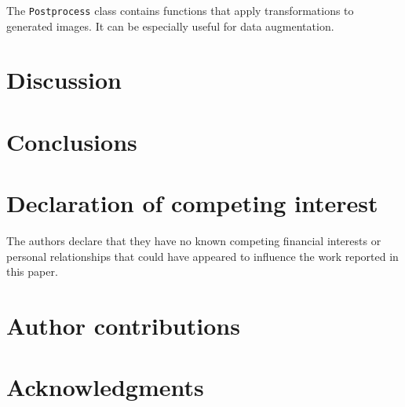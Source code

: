 \documentclass[a4paper,fleqn]{cas-dc}
\begin{document}
The \texttt{Postprocess} class contains functions that apply transformations to generated images. It can be especially useful for data augmentation.

\newpage

\section{Discussion} \label{sec:results}

%

\section{Conclusions}



\section*{Declaration of competing interest}

The authors declare that they have no known competing financial interests or personal relationships that could have appeared to influence the work reported in this paper.

\section*{Author contributions}



\section*{Acknowledgments}






\end{document}
